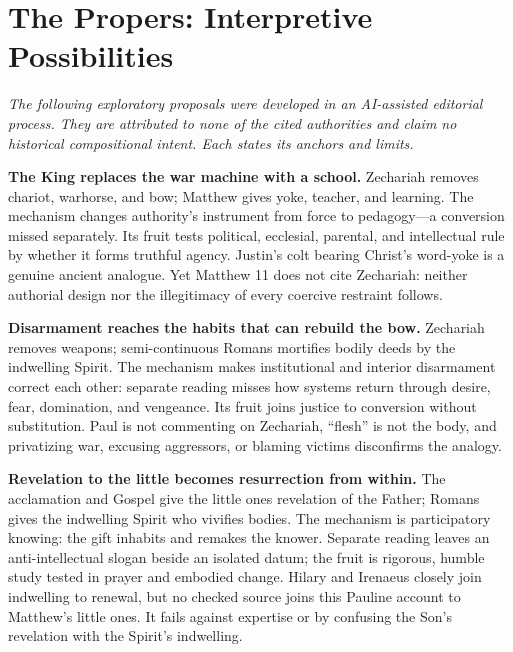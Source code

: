 \section*{The Propers: Interpretive Possibilities}

\noindent\emph{The following exploratory proposals were developed in an AI-assisted editorial process. They are attributed to none of the cited authorities and claim no historical compositional intent. Each states its anchors and limits.}

\noindent\textbf{The King replaces the war machine with a school.\enspace{}}
Zechariah removes chariot, warhorse, and bow; Matthew gives yoke, teacher, and learning. The mechanism changes authority's instrument from force to pedagogy---a conversion missed separately. Its fruit tests political, ecclesial, parental, and intellectual rule by whether it forms truthful agency. Justin's colt bearing Christ's word-yoke is a genuine ancient analogue. Yet Matthew 11 does not cite Zechariah: neither authorial design nor the illegitimacy of every coercive restraint follows.

\noindent\textbf{Disarmament reaches the habits that can rebuild the bow.\enspace{}}
Zechariah removes weapons; semi-continuous Romans mortifies bodily deeds by the indwelling Spirit. The mechanism makes institutional and interior disarmament correct each other: separate reading misses how systems return through desire, fear, domination, and vengeance. Its fruit joins justice to conversion without substitution. Paul is not commenting on Zechariah, “flesh” is not the body, and privatizing war, excusing aggressors, or blaming victims disconfirms the analogy.

\noindent\textbf{Revelation to the little becomes resurrection from within.\enspace{}}
The acclamation and Gospel give the little ones revelation of the Father; Romans gives the indwelling Spirit who vivifies bodies. The mechanism is participatory knowing: the gift inhabits and remakes the knower. Separate reading leaves an anti-intellectual slogan beside an isolated datum; the fruit is rigorous, humble study tested in prayer and embodied change. Hilary and Irenaeus closely join indwelling to renewal, but no checked source joins this Pauline account to Matthew's little ones. It fails against expertise or by confusing the Son's revelation with the Spirit's indwelling.

